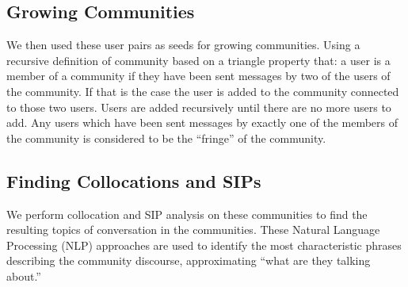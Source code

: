 \subsection{Growing Communities}

We then used these user pairs as seeds for growing communities.  Using a recursive definition of community based on a triangle property that: a user is a member of a community if they have been sent messages by two of the users of the community.  If that is the case the user is added to the community connected to those two users. Users are added recursively until there are no more users to add.  Any users which have been sent messages by exactly one of the members of the community is considered to be the ``fringe'' of the community.

\subsection{Finding Collocations and SIPs}

We perform collocation and SIP analysis on these communities to find the resulting topics of conversation in the communities.  These Natural Language Processing (NLP) approaches are used to identify the most characteristic phrases describing the community discourse, approximating ``what are they talking about.''
